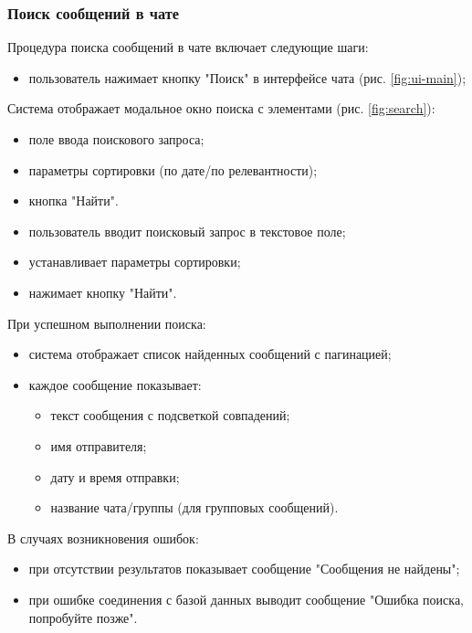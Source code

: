 \subsubsection{Поиск сообщений в чате}
Процедура поиска сообщений в чате включает следующие шаги:

\begin{itemize}
	\item пользователь нажимает кнопку "Поиск" в интерфейсе чата (рис. \ref{fig:ui-main});
\end{itemize}

Система отображает модальное окно поиска с элементами (рис. \ref{fig:search}):
\begin{itemize}
	\item поле ввода поискового запроса;
	\item параметры сортировки (по дате/по релевантности);
	\item кнопка "Найти".
\end{itemize}

\begin{itemize}
	\item пользователь вводит поисковый запрос в текстовое поле;
	\item устанавливает параметры сортировки;
	\item нажимает кнопку "Найти".
\end{itemize}

При успешном выполнении поиска:
\begin{itemize}
	\item система отображает список найденных сообщений с пагинацией;
	\item каждое сообщение показывает:
	\begin{itemize}
		\item текст сообщения с подсветкой совпадений;
		\item имя отправителя;
		\item дату и время отправки;
		\item название чата/группы (для групповых сообщений).
	\end{itemize}
\end{itemize}

В случаях возникновения ошибок:
\begin{itemize}
	\item при отсутствии результатов показывает сообщение "Сообщения не найдены";
	\item при ошибке соединения с базой данных выводит сообщение "Ошибка поиска, попробуйте позже".
\end{itemize}


